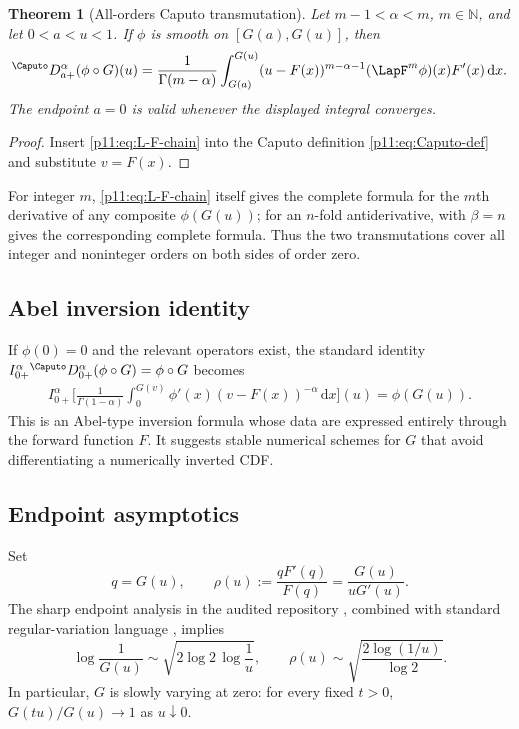 \documentclass[11pt,oneside]{article}
\newtheorem{theorem}{Theorem}[section]
\theoremstyle{definition}
\theoremstyle{remark}
\newcommand{\N}{\mathbb N}
\newcommand{\dd}{\,\mathrm d}
\newcommand{\1}{\mathbf 1}
\begin{document}
\begin{theorem}[All-orders Caputo transmutation]
\label{p11:thm:all-caputo}
Let $m-1<\alpha<m$, $m\in\N$, and let $0<a<u<1$.  If $\phi$ is smooth on
$[G(a),G(u)]$, then
\begin{equation}
 {}^{\Caputo}D_{a+}^{\alpha}(\phi\circ G)(u)
 =\frac1{\Gamma(m-\alpha)}
  \int_{G(a)}^{G(u)}
  (u-F(x))^{m-\alpha-1}
  (\LapF^m\phi)(x)F'(x)\dd x.
 \label{p11:eq:all-order-caputo-transmutation}
\end{equation}
The endpoint $a=0$ is valid whenever the displayed integral converges.
\end{theorem}

\begin{proof}
Insert \eqref{p11:eq:L-F-chain} into the Caputo definition
\eqref{p11:eq:Caputo-def} and substitute $v=F(x)$.
\end{proof}

For integer $m$, \eqref{p11:eq:L-F-chain} itself gives the complete formula for
the $m$th derivative of any composite $\phi(G(u))$; for an $n$-fold
antiderivative,  with $\beta=n$ gives the
corresponding complete formula.  Thus the two transmutations cover all
integer and noninteger orders on both sides of order zero.

\subsection{Abel inversion identity}

If $\phi(0)=0$ and the relevant operators exist, the standard identity
$I_{0+}^{\alpha}{}^{\Caputo}D_{0+}^{\alpha}(\phi\circ G)=\phi\circ G$ becomes
\begin{align}
 I_{0+}^{\alpha}\Bigg[
 \frac1{\Gamma(1-\alpha)}
 \int_0^{G(v)}\phi'(x)(v-F(x))^{-\alpha}\dd x
 \Bigg](u)
 =\phi(G(u)).
 \label{p11:eq:Abel-inversion-quantile}
\end{align}
This is an Abel-type inversion formula whose data are expressed entirely
through the forward function $F$.  It suggests stable numerical schemes for
$G$ that avoid differentiating a numerically inverted CDF.

\subsection{Endpoint asymptotics}

Set
\begin{equation}
 q=G(u),
 \qquad
 \rho(u):=\frac{qF'(q)}{F(q)}
 =\frac{G(u)}{uG'(u)}.
 \label{p11:eq:rho-def}
\end{equation}
The sharp endpoint analysis in the audited repository \cite{p11:ProveIt},
combined with standard regular-variation language \cite{p11:BGT}, implies
\begin{equation}
 \log\frac1{G(u)}
 \sim\sqrt{2\log 2\,\log\frac1u},
 \qquad
 \rho(u)\sim
 \sqrt{\frac{2\log(1/u)}{\log2}}.
 \label{p11:eq:G-leading-endpoint}
\end{equation}
In particular, $G$ is slowly varying at zero: for every fixed $t>0$,
$G(tu)/G(u)\to1$ as $u\downarrow0$.
\end{document}
